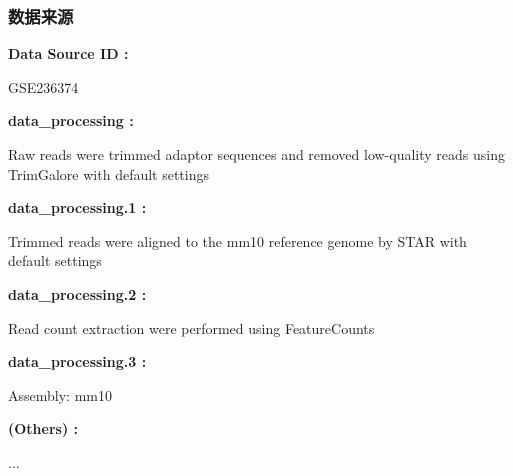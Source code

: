 \documentclass[
]{article}
\begin{document}
\hypertarget{ux6570ux636eux6765ux6e90}{%
\subsubsection{数据来源}\label{ux6570ux636eux6765ux6e90}}

\begin{center}\begin{tcolorbox}[colback=gray!10, colframe=gray!50, width=0.9\linewidth, arc=1mm, boxrule=0.5pt]
\textbf{
Data Source ID
:}

\vspace{0.5em}

    GSE236374

\vspace{2em}


\textbf{
data\_processing
:}

\vspace{0.5em}

    Raw reads were trimmed adaptor sequences and removed
low-quality reads using TrimGalore with default settings

\vspace{2em}


\textbf{
data\_processing.1
:}

\vspace{0.5em}

    Trimmed reads were aligned to the mm10 reference genome
by STAR with default settings

\vspace{2em}


\textbf{
data\_processing.2
:}

\vspace{0.5em}

    Read count extraction were performed using
FeatureCounts

\vspace{2em}


\textbf{
data\_processing.3
:}

\vspace{0.5em}

    Assembly: mm10

\vspace{2em}


\textbf{
(Others)
:}

\vspace{0.5em}

    ...

\vspace{2em}
\end{tcolorbox}
\end{center}
\end{document}
